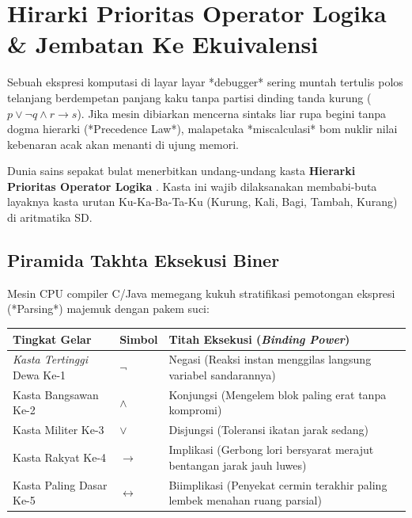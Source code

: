 \section{Hirarki Prioritas Operator Logika \& Jembatan Ke Ekuivalensi}

Sebuah ekspresi komputasi di layar layar *debugger* sering muntah tertulis polos telanjang berdempetan panjang kaku tanpa partisi dinding tanda kurung ($p \lor \neg q \land r \rightarrow s$). Jika mesin dibiarkan mencerna sintaks liar rupa begini tanpa dogma hierarki (*Precedence Law*), malapetaka *miscalculasi* bom nuklir nilai kebenaran acak akan menanti di ujung memori.

Dunia sains sepakat bulat menerbitkan undang-undang kasta \textbf{Hierarki Prioritas Operator Logika} \cite{rosen2019}. Kasta ini wajib dilaksanakan membabi-buta layaknya kasta urutan Ku-Ka-Ba-Ta-Ku (Kurung, Kali, Bagi, Tambah, Kurang) di aritmatika SD. 

\subsection{Piramida Takhta Eksekusi Biner}

Mesin CPU compiler C/Java memegang kukuh stratifikasi pemotongan ekspresi (*Parsing*) majemuk dengan pakem suci:

\begin{center}
	\small
	\begin{tabular}{|p{2.2cm}|p{1.2cm}|p{7.8cm}|}
		\hline
		\textbf{Tingkat Gelar} & \textbf{Simbol} & \textbf{Titah Eksekusi (\textit{Binding Power})} \\
		\hline
		\textit{Kasta Tertinggi} Dewa Ke-1 & $\neg$ & Negasi (Reaksi instan menggilas langsung variabel sandarannya) \\ \hline
		Kasta Bangsawan Ke-2 & $\wedge$ & Konjungsi (Mengelem blok paling erat tanpa kompromi) \\ \hline
		Kasta Militer Ke-3 & $\vee$ & Disjungsi (Toleransi ikatan jarak sedang) \\ \hline
		Kasta Rakyat Ke-4 & $\rightarrow$ & Implikasi (Gerbong lori bersyarat merajut bentangan jarak jauh luwes) \\ \hline
		Kasta Paling Dasar Ke-5 & $\leftrightarrow$ & Biimplikasi (Penyekat cermin terakhir paling lembek menahan ruang parsial) \\ \hline
	\end{tabular}
\end{center}

